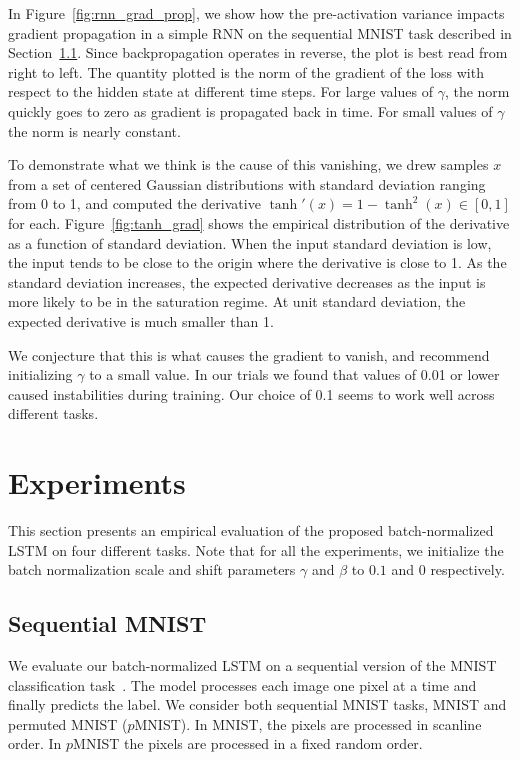 \documentclass{article} \pdfoutput=1 \usepackage[utf8]{inputenc}
\begin{document}
In Figure~\ref{fig:rnn_grad_prop}, we show how the pre-activation variance
impacts gradient propagation in a simple RNN on the sequential MNIST task
described in Section~\ref{sec:seqmnist}.  Since backpropagation operates in
reverse, the plot is best read from right to left.  The quantity plotted is the
norm of the gradient of the loss with respect to the hidden state at different
time steps.  For large values of $\gamma$, the norm quickly goes to zero as
gradient is propagated back in time.  For small values of $\gamma$ the norm is
nearly constant.

To demonstrate what we think is the cause of this vanishing, we drew samples
$x$ from a set of centered Gaussian distributions with standard deviation
ranging from 0 to 1, and computed the derivative $\tanh'(x) = 1 - \tanh^2(x)
\in [0, 1]$ for each.  Figure~\ref{fig:tanh_grad} shows the empirical
distribution of the derivative as a function of standard deviation.  When the
input standard deviation is low, the input tends to be close to the origin
where the derivative is close to 1.  As the standard deviation increases, the
expected derivative decreases as the input is more likely to be in the
saturation regime.  At unit standard deviation, the expected derivative is much
smaller than 1.

We conjecture that this is what causes the gradient to vanish, and recommend
initializing $\gamma$ to a small value.  In our trials we found that values of
0.01 or lower caused instabilities during training.  Our choice of 0.1 seems to
work well across different tasks.

\section{Experiments}
\label{sec:experiments}

This section presents an empirical evaluation of the proposed batch-normalized
LSTM on four different tasks.  Note that for all the experiments, we initialize
the batch normalization scale and shift parameters $\gamma$ and $\beta$ to
$0.1$ and $0$ respectively.

\subsection{Sequential MNIST}
\label{sec:seqmnist}

We evaluate our batch-normalized LSTM on a sequential version of the MNIST
classification task~\citep{le2015simple}.  The model processes each image one
pixel at a time and finally predicts the label.  We consider both sequential
MNIST tasks, MNIST and permuted MNIST ($p$MNIST).  In MNIST, the pixels are
processed in scanline order.  In $p$MNIST the pixels are processed in a fixed
random order.
\end{document}
